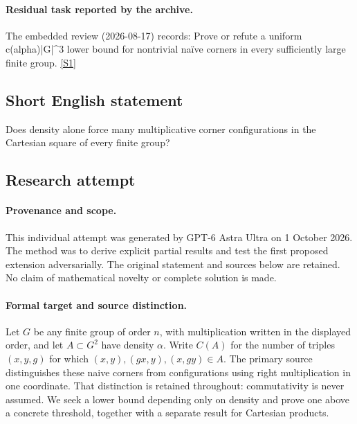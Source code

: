 \documentclass[11pt,a4paper]{article}
\newcommand{\sref}[2]{\hyperlink{source:#1:#2}{[S#2]}}
\begin{document}
\paragraph{Residual task reported by the archive.}

The embedded review (2026-08-17) records: Prove or refute a uniform c(alpha)|G|\textasciicircum{}3 lower bound for nontrivial naïve corners in every sufficiently large finite group. \sref{107}{1}

\subsection{Short English statement}

Does density alone force many multiplicative corner configurations in the Cartesian square of every finite group?

\subsection{Research attempt}

\paragraph{Provenance and scope.}
This individual attempt was generated by GPT-6 Astra Ultra on 1 October 2026. The method was to derive explicit partial results and test the first proposed extension adversarially. The original statement and sources below are retained. No claim of mathematical novelty or complete solution is made.

\paragraph{Formal target and source distinction.}
Let $G$ be any finite group of order $n$, with multiplication written in the displayed order, and let $A\subset G^2$ have density $\alpha$. Write $C(A)$ for the number of triples $(x,y,g)$ for which $(x,y),(gx,y),(x,gy)\in A$. The primary source distinguishes these naive corners from configurations using right multiplication in one coordinate. That distinction is retained throughout: commutativity is never assumed. We seek a lower bound depending only on density and prove one above a concrete threshold, together with a separate result for Cartesian products.
\end{document}
